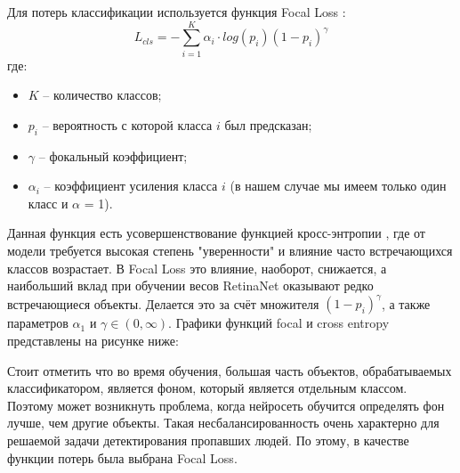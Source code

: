 Для потерь классификации используется функция Focal Loss \cite{lib-focal-loss}:
$$
L_{cls} = -\sum_{i=1}^K \alpha_i \cdot log(p_i)(1-p_i)^\gamma
$$
где:
\begin{itemize}
    \item $K$ -- количество классов;
    \item $p_i$ -- вероятность с которой класса $i$ был предсказан;
    \item $\gamma$ -- фокальный коэффициент;
    \item $\alpha_i$ -- коэффициент усиления класса $i$ (в нашем случае мы имеем только один класс и $\alpha$ = 1).
\end{itemize}

Данная функция есть усовершенствование функцией кросс-энтропии \cite{lib-focal-loss}, где от модели требуется высокая степень "уверенности" и влияние часто встречающихся классов возрастает. В Focal Loss это влияние, наоборот, снижается, а наибольший вклад при обучении весов RetinaNet оказывают редко встречающиеся объекты. Делается это за счёт множителя $(1-p_i)^\gamma$, а также параметров $\alpha_1$ и $\gamma \in(0, \infty)$. Графики функций focal и cross entropy представлены на рисунке ниже:


Стоит отметить что во время обучения, большая часть объектов, обрабатываемых классификатором, является фоном, который является отдельным классом. Поэтому может возникнуть проблема, когда нейросеть обучится определять фон лучше, чем другие объекты. Такая несбалансированность очень характерно для решаемой задачи детектирования пропавших людей. По этому, в качестве функции потерь была выбрана Focal Loss.
